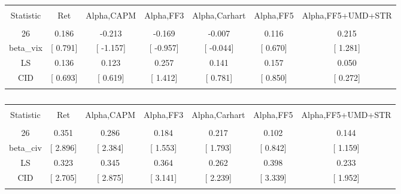 \documentclass[16pt]{article}
\begin{document}
\begin{table}[!htbp] \centering 
  \caption{} 
  \label{} 
\begin{tabular}{@{\extracolsep{5pt}} ccccccc} 
\\[-1.8ex]\hline 
\hline \\[-1.8ex] 
Statistic & Ret & Alpha,CAPM & Alpha,FF3 & Alpha,Carhart & Alpha,FF5 & Alpha,FF5+UMD+STR \\ 
\hline \\[-1.8ex] 
26 & 0.186 & -0.213 & -0.169 & -0.007 & 0.116 & 0.215 \\ 
beta\_vix & [ 0.791] & [ -1.157] & [ -0.957] & [ -0.044] & [ 0.670] & [ 1.281] \\ 
LS & 0.136 & 0.123 & 0.257 & 0.141 & 0.157 & 0.050 \\ 
CID & [ 0.693] & [ 0.619] & [ 1.412] & [ 0.781] & [ 0.850] & [ 0.272] \\ 
\hline \\[-1.8ex] 
\end{tabular} 
\end{table}

\begin{table}[!htbp] \centering 
  \caption{} 
  \label{} 
\begin{tabular}{@{\extracolsep{5pt}} ccccccc} 
\\[-1.8ex]\hline 
\hline \\[-1.8ex] 
Statistic & Ret & Alpha,CAPM & Alpha,FF3 & Alpha,Carhart & Alpha,FF5 & Alpha,FF5+UMD+STR \\ 
\hline \\[-1.8ex] 
26 & 0.351 & 0.286 & 0.184 & 0.217 & 0.102 & 0.144 \\ 
beta\_civ & [ 2.896] & [ 2.384] & [ 1.553] & [ 1.793] & [ 0.842] & [ 1.159] \\ 
LS & 0.323 & 0.345 & 0.364 & 0.262 & 0.398 & 0.233 \\ 
CID & [ 2.705] & [ 2.875] & [ 3.141] & [ 2.239] & [ 3.339] & [ 1.952] \\ 
\hline \\[-1.8ex] 
\end{tabular} 
\end{table}
\end{document}
